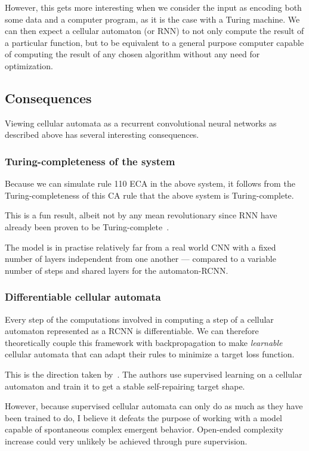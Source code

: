 However, this gets more interesting when we consider the input as encoding both
some data and a computer program, as it is the case with a Turing machine. We can
then expect a cellular automaton (or RNN) to not only compute the result of a particular
function, but to be equivalent to a general purpose computer capable of
computing the result of any chosen algorithm without any need for optimization.


\subsection{Consequences}

Viewing cellular automata as a recurrent convolutional neural networks  as
described above has several interesting consequences.

\subsubsection{Turing-completeness of the system}

Because we can simulate rule 110 ECA in the above system, it follows from the
Turing-completeness of this CA rule that the above system is Turing-complete.

This is a fun result, albeit not by any mean revolutionary since RNN have already
been proven to be Turing-complete~\parencite{siegelmannComputationalPowerNeural1992}.

The model is in practise relatively far from a real world CNN with a fixed
number of layers independent from one another --- compared to a variable number
of steps and shared layers for the automaton-RCNN\@.

\subsubsection{Differentiable cellular automata}

Every step of the computations involved in computing a step of a cellular
automaton represented as a RCNN is differentiable. We can therefore
theoretically couple this framework with backpropagation to make
\emph{learnable} cellular automata that can adapt their rules to minimize a
target loss function.

This is the direction taken by~\textcite{mordvintsevGrowingNeuralCellular2020}.
The authors use supervised learning on a cellular automaton and train it to get
a stable self-repairing target shape.

However, because supervised cellular automata can only do as much as they have
been trained to do, I believe it defeats the purpose of working with a model
capable of spontaneous complex emergent behavior. Open-ended complexity increase
could very unlikely be achieved through pure supervision.

